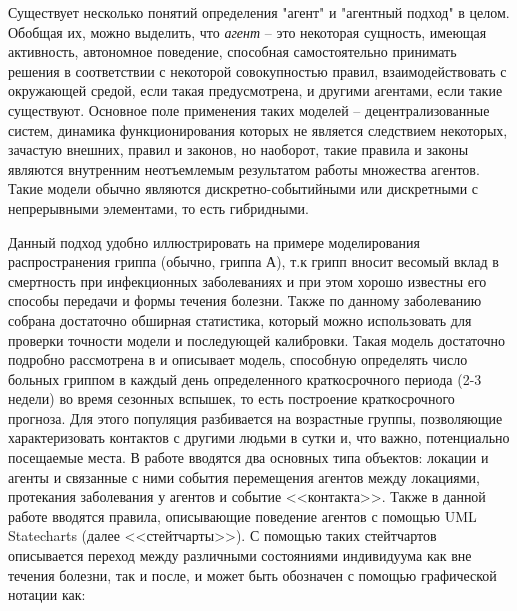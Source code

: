Существует несколько понятий определения "агент" и "агентный подход" в целом. Обобщая их, можно выделить, что  \textit{агент}  -- это некоторая сущность, имеющая активность, автономное поведение, способная самостоятельно принимать решения в соответствии с некоторой совокупностью правил, взаимодействовать с окружающей средой, если такая предусмотрена, и другими агентами, если такие существуют. Основное поле применения таких моделей -- децентрализованные систем, динамика функционирования которых не является следствием некоторых, зачастую внешних, правил и законов, но наоборот, такие правила и законы являются внутренним неотъемлемым результатом работы множества агентов. Такие модели обычно являются  дискретно-событийными или дискретными с непрерывными элементами, то есть гибридными. 

Данный подход удобно иллюстрировать на примере моделирования распространения гриппа (обычно, гриппа А), т.к грипп вносит весомый вклад в смертность при инфекционных заболеваниях и при этом хорошо известны его способы передачи и формы течения болезни. Также по данному заболеванию собрана достаточно обширная статистика, который можно использовать для проверки точности модели и последующей калибровки.  Такая модель достаточно подробно рассмотрена в  %
\cite{Kondratiev:2010}
и описывает модель, способную определять число больных гриппом в каждый день определенного краткосрочного периода (2-3 недели) во время сезонных вспышек, то есть построение краткосрочного прогноза. Для этого популяция  разбивается на возрастные группы, позволяющие характеризовать контактов с другими людьми в сутки и, что важно, потенциально посещаемые места. В работе вводятся два основных типа объектов: локации и агенты и связанные с ними события перемещения агентов между локациями, протекания заболевания у агентов и событие <<контакта>>. Также в данной работе вводятся правила, описывающие поведение агентов с помощью UML Statecharts (далее <<стейтчарты>>). С помощью таких стейтчартов описывается переход между различными состояниями индивидуума как вне течения болезни, так и после, и может быть обозначен с помощью графической нотации как: 

